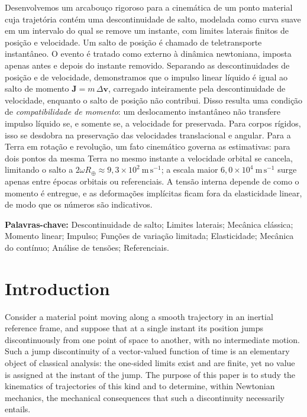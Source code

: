 \documentclass[11pt]{article}
\begin{document}
	\noindent
	Desenvolvemos um arcabouço rigoroso para a cinemática de um ponto
	material cuja trajetória contém uma descontinuidade de salto,
	modelada como curva suave em um intervalo do qual se remove um
	instante, com limites laterais finitos de posição e velocidade. Um
	salto de posição é chamado de teletransporte instantâneo. O evento é
	tratado como externo à dinâmica newtoniana, imposta apenas antes e
	depois do instante removido. Separando as descontinuidades de posição
	e de velocidade, demonstramos que o impulso linear líquido é igual ao
	salto de momento $\mathbf J=m\,\Delta\mathbf v$, carregado
	inteiramente pela descontinuidade de velocidade, enquanto o salto de
	posição não contribui. Disso resulta uma condição de
	\emph{compatibilidade de momento}: um deslocamento instantâneo não
	transfere impulso líquido se, e somente se, a velocidade for
	preservada. Para corpos rígidos, isso se desdobra na preservação das
	velocidades translacional e angular. Para a Terra em rotação e
	revolução, um fato cinemático governa as estimativas: para dois
	pontos da mesma Terra no mesmo instante a velocidade orbital se
	cancela, limitando o salto a $2\omega R_{\oplus}\approx
	9{,}3\times10^{2}\ \mathrm{m\,s^{-1}}$; a escala maior
	$6{,}0\times10^{4}\ \mathrm{m\,s^{-1}}$ surge apenas entre épocas
	orbitais ou referenciais. A tensão interna depende de como o momento
	é entregue, e as deformações implícitas ficam fora da elasticidade
	linear, de modo que os números são indicativos.
	
	\vspace{0.2cm}
	
	\noindent
	\textbf{Palavras-chave:}
	Descontinuidade de salto;
	Limites laterais;
	Mecânica clássica;
	Momento linear;
	Impulso;
	Funções de variação limitada;
	Elasticidade;
	Mecânica do contínuo;
	Análise de tensões;
	Referenciais.
	
	\section{Introduction}
	
	Consider a material point moving along a smooth trajectory in an
	inertial reference frame, and suppose that at a single instant its
	position jumps discontinuously from one point of space to another,
	with no intermediate motion. Such a jump discontinuity of a
	vector-valued function of time is an elementary object of classical
	analysis: the one-sided limits exist and are finite, yet no value is
	assigned at the instant of the jump. The purpose of this paper is to
	study the kinematics of trajectories of this kind and to determine,
	within Newtonian mechanics, the mechanical consequences that such a
	discontinuity necessarily entails.
	
\end{document}
